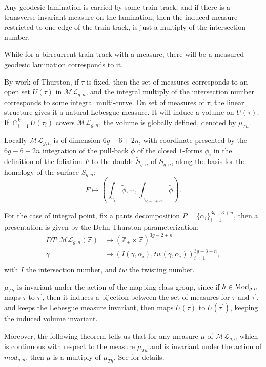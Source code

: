 Any geodesic lamination is carried by some train track, and if there is a transverse invariant measure on the lamination, then the induced measure restricted  to one edge  of the train track, is just a multiply of the intersection number. 

While for a birrcurrent train track with a measure, there will be a measured geodesic lamination corresponds to it. 

By work of Thurston, if $\tau$ is fixed, then the set of measures corresponds to an open set $U(\tau)$  in $\mathscr{ML}_{g,n}$, and the integral multiply of the intersection  number corresponds to some integral multi-curve. On set of measures of $\tau$, the linear structure gives it a natural Lebesgue measure. It will induce a volume on $U(\tau)$. If $\cap_{i=1}^kU(\tau_i)$ covers $\mathscr{ML}_{g,n}$, the volume is globally defined, denoted by $\mu_{Th}$. 

Locally $\mathscr{ML}_{g,n}$ is of dimension $6g-6+2n$, with coordinate presented by the $6g-6+2n$ integration of the pull-back $\tilde{\phi}$  of the  closed $1$-forms $\phi_i$  in the definition of the foliation $F$ to the double $\tilde{S}_{g,n}$ of $S_{g,n}$,  along the basis for the homology of the surface $S_{g,n}$:
$$
F\mapsto (\int_{\gamma_1}\tilde{\phi},\cdots,\int_{\gamma_{6g-6+2n}}\tilde{\phi}).
$$

For the case of integral  point, fix a pants decomposition $P=\{\alpha_i\}_{i=1}^{3g-3+n}$, then  a presentation is given by the Dehn-Thurston parameterization\cite{traintracks}:
$$
\begin{aligned}
DT:\mathscr{ML}_{g,n}(\mathbb{Z})&\to (\mathbb{Z}_+\times \mathbb{Z})^{3g-2+n}\\
\gamma&\mapsto (I(\gamma,\alpha_i),tw(\gamma,\alpha_i))_{i=1}^{3g-3+n},\\
\end{aligned}
$$
with $I$  the intersection number, and $tw$  the twisting number.





$\mu_{Th}$ is invariant under the action of the mapping class group, since if $h\in \operatorname{Mod}_{g,n}$ maps $\tau$ to $\tau^\prime$, then it induces a bijection between the set of   measures for  $\tau$ and $\tau^\prime$, and keeps the Lebesgue measure invariant, then maps $U(\tau)$ to $U(\tau^\prime)$, keeping the induced  volume invariant. 

Moreover, the following theorem tells us that for any measure $\mu$ of $\mathscr{ML}_{g,n}$ which is continuous with respect to the measure $\mu_{Th}$ and is invariant under the action of $mod_{g,n}$, then $\mu$ is a multiply of $\mu_{Th}$. See \cite{ergodic} for details.

